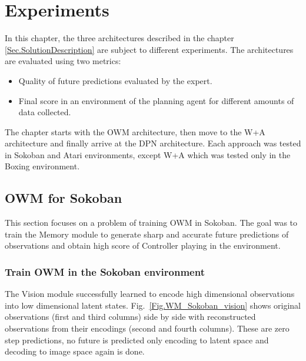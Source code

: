 \section{Experiments}

In this chapter, the three architectures described in the chapter \ref{Sec.SolutionDescription} are subject to different experiments. The architectures are evaluated using two metrics:
\begin{itemize}
\item Quality of future predictions evaluated by the expert.
\item Final score in an environment of the planning agent for different amounts of data collected.
\end{itemize}
The chapter starts with the OWM architecture, then move to the W+A architecture and finally arrive at the DPN architecture. Each approach was tested in Sokoban and Atari environments, except W+A which was tested only in the Boxing environment.

\subsection{OWM for Sokoban}

This section focuses on a problem of training OWM in Sokoban. The goal was to train the Memory module to generate sharp and accurate future predictions of observations and obtain high score of Controller playing in the environment.

\subsubsection{Train OWM in the Sokoban environment}

The Vision module successfully learned to encode high dimensional observations into low dimensional latent states. Fig.~\ref{Fig.WM_Sokoban_vision} shows original observations (first and third columns) side by side with reconstructed observations from their encodings (second and fourth columns). These are zero step predictions, no future is predicted only encoding to latent space and decoding to image space again is done.

